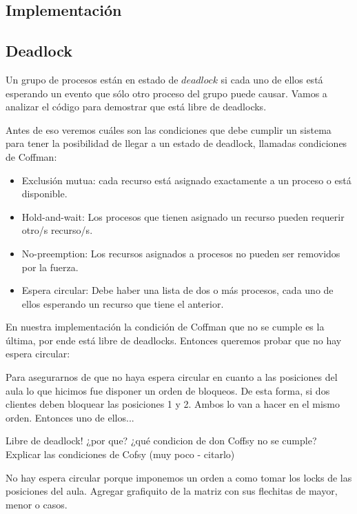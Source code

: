 \subsection{Implementación}


\subsection{Deadlock}
Un grupo de procesos están en estado de $deadlock$ si cada uno de ellos está esperando un evento que sólo otro proceso del grupo puede causar.
Vamos a analizar el código para demostrar que está libre de deadlocks.

Antes de eso veremos cuáles son las condiciones que debe cumplir un sistema para tener la posibilidad de llegar a un estado de deadlock, llamadas
condiciones de Coffman:
\begin{itemize}
 \item Exclusión mutua: cada recurso está asignado exactamente a un proceso o está disponible.
 \item Hold-and-wait: Los procesos que tienen asignado un recurso pueden requerir otro/s recurso/s.
 \item No-preemption: Los recursos asignados a procesos no pueden ser removidos por la fuerza.
 \item Espera circular: Debe haber una lista de dos o más procesos, cada uno de ellos esperando un recurso que tiene el anterior.
\end{itemize}

En nuestra implementación la condición de Coffman que no se cumple es la última, por ende está libre de deadlocks.
Entonces queremos probar que no hay espera circular:

Para asegurarnos de que no haya espera circular en cuanto a las posiciones del aula lo que hicimos fue disponer un orden de bloqueos.
De esta forma, si dos clientes deben bloquear las posiciones 1 y 2. Ambos lo van a hacer en el mismo orden. Entonces uno de ellos... %



Libre de deadlock! ¿por que? ¿qué condicion de don Coffsy no se cumple?
Explicar las condiciones de Cofsy (muy poco - citarlo)

No hay espera circular porque imponemos un orden a como tomar los locks de las posiciones del aula. 
Agregar grafiquito de la matriz con sus flechitas de mayor, menor o casos.

